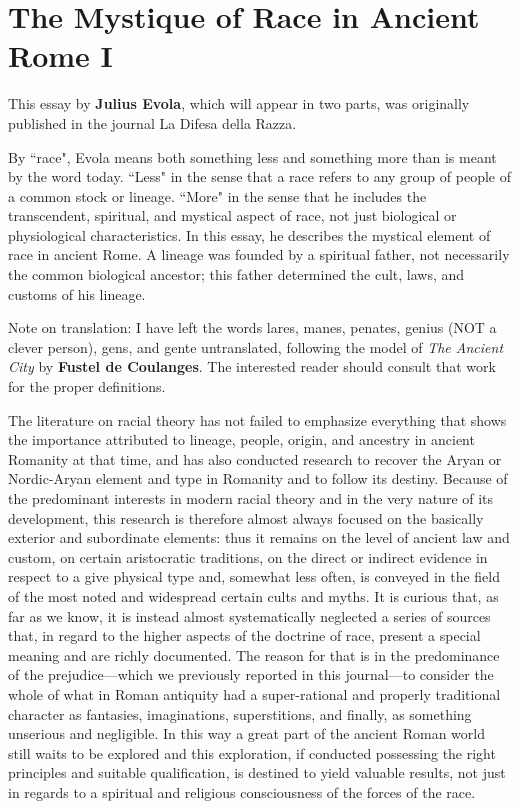 \section{The Mystique of Race in Ancient Rome I}

\begin{quotex}
This essay by \textbf{Julius Evola}, which will appear in two parts, was originally published in the journal La Difesa della Razza.

By ``race", Evola means both something less and something more than is meant by the word today. ``Less" in the sense that a race refers to any group of people of a common stock or lineage. ``More" in the sense that he includes the transcendent, spiritual, and mystical aspect of race, not just biological or physiological characteristics. In this essay, he describes the mystical element of race in ancient Rome. A lineage was founded by a spiritual father, not necessarily the common biological ancestor; this father determined the cult, laws, and customs of his lineage.

Note on translation: I have left the words lares, manes, penates, genius (NOT a clever person), gens, and gente untranslated, following the model of \emph{The Ancient City} by \textbf{Fustel de Coulanges}. The interested reader should consult that work for the proper definitions.

\end{quotex}
The literature on racial theory has not failed to emphasize everything that shows the importance attributed to lineage, people, origin, and ancestry in ancient Romanity at that time, and has also conducted research to recover the Aryan or Nordic-Aryan element and type in Romanity and to follow its destiny. Because of the predominant interests in modern racial theory and in the very nature of its development, this research is therefore almost always focused on the basically exterior and subordinate elements: thus it remains on the level of ancient law and custom, on certain aristocratic traditions, on the direct or indirect evidence in respect to a give physical type and, somewhat less often, is conveyed in the field of the most noted and widespread certain cults and myths. It is curious that, as far as we know, it is instead almost systematically neglected a series of sources that, in regard to the higher aspects of the doctrine of race, present a special meaning and are richly documented. The reason for that is in the predominance of the prejudice—which we previously reported in this journal—to consider the whole of what in Roman antiquity had a super-rational and properly traditional character as fantasies, imaginations, superstitions, and finally, as something unserious and negligible. In this way a great part of the ancient Roman world still waits to be explored and this exploration, if conducted possessing the right principles and suitable qualification, is destined to yield valuable results, not just in regards to a spiritual and religious consciousness of the forces of the race.

